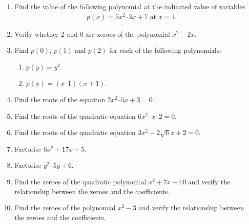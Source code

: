 \renewcommand{\theequation}{\theenumi}
\begin{enumerate}[label=\arabic*.,ref=\thesubsection.\theenumi]
%
%
\item Find the value of  the following polynomial at the indicated value of variables 
\begin{align}
p(x) = 5x^2– 3x + 7 \text{  at } x = 1.
\end{align}
\item Verify whether 2 and 0 are zeroes of the polynomial $x^2-2x$.
\\
\solution 

\item Find $p(0)$, $p(1)$ and $p(2)$ for each of the following polynomials: 
\begin{enumerate}
\item $p(y) = y^2$. 
\item $p(x) = (x – 1) (x + 1)$.
\end{enumerate}
\solution 

\item Find the roots of the equation  $2x^2– 5x + 3 = 0$ .
\item Find the roots of the quadratic equation $6x^2– x – 2 = 0.$
\item Find the roots of the quadratic equation $3x^2 -2 \sqrt{6}x+ 2 = 0$.
%
%
\item Factorise $6x^2+ 17x + 5$.
\item Factorise $y^2 – 5y + 6$.
\item Find the zeroes of the quadratic polynomial $x^2+7x+10$ and verify the relationship between the zeroes and the coefficients.
\item Find the zeroes of the polynomial $x^2-3$ and verify the relationship between the zeroes and the coefficients.

\end{enumerate}
